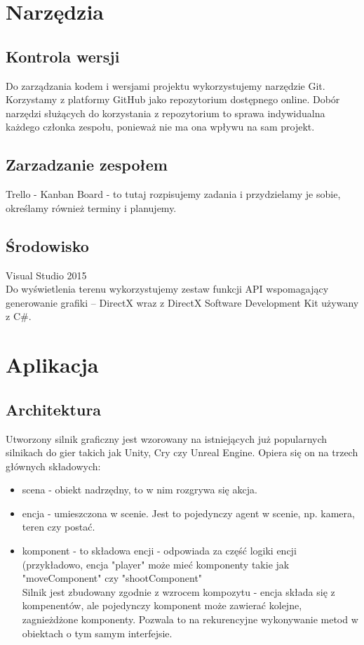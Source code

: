 \documentclass[12pt,a4paper]{article}
\begin{document}
\section{Narzędzia}
\subsection{Kontrola wersji}
Do zarządzania kodem i wersjami projektu wykorzystujemy narzędzie Git. Korzystamy z platformy GitHub jako repozytorium dostępnego online. Dobór narzędzi służących do korzystania z repozytorium to sprawa indywidualna każdego członka zespołu, ponieważ nie ma ona wpływu na sam projekt.
\subsection{Zarzadzanie zespołem}
Trello - Kanban Board - to tutaj rozpisujemy zadania i przydzielamy je sobie, określamy również terminy i planujemy.
\subsection{Środowisko}
Visual Studio 2015 \\
Do wyświetlenia terenu wykorzystujemy zestaw funkcji API wspomagający generowanie grafiki – DirectX wraz z DirectX Software Development Kit używany z C\#.
\section{Aplikacja}
\subsection{Architektura}
Utworzony silnik graficzny jest wzorowany na istniejących już popularnych silnikach do gier takich jak Unity, Cry czy Unreal Engine. Opiera się on na trzech głównych składowych: \begin{itemize}
\item scena - obiekt nadrzędny, to w nim rozgrywa się akcja.
\item encja - umieszczona w scenie. Jest to pojedynczy agent w scenie, np. kamera, teren czy postać. 
\item komponent - to składowa encji - odpowiada za część logiki encji (przykładowo, encja "player" może mieć komponenty takie jak "moveComponent" czy "shootComponent"
\\
Silnik jest zbudowany zgodnie z wzrocem kompozytu - encja składa się z kompenentów, ale pojedynczy komponent może zawierać kolejne, zagnieżdżone komponenty. Pozwala to na rekurencyjne wykonywanie metod w obiektach o tym samym interfejsie.
\end{itemize}
\end{document}
